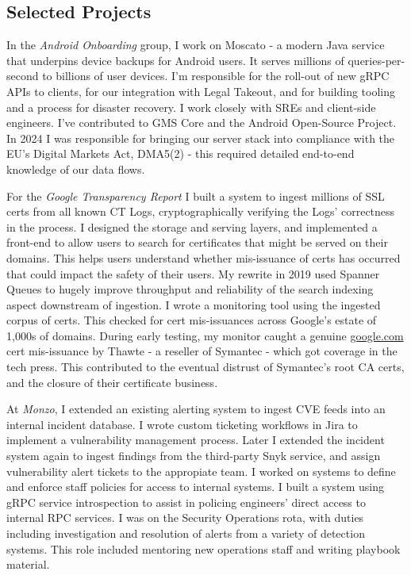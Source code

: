 \documentclass[line]{resume}
\begin{document}
\begin{resume}
    \section{\mysidestyle Selected Projects}

    In the \textsl{Android Onboarding} group, I work on Moscato - a modern Java service that underpins device backups
    for Android users. It serves millions of queries-per-second to billions of user devices. I'm responsible for the
    roll-out of new gRPC APIs to clients, for our integration with Legal Takeout, and for building tooling and a process
    for disaster recovery.  I work closely with SREs and client-side engineers.  I've contributed to GMS Core and the
    Android Open-Source Project.  In 2024 I was responsible for bringing our server stack into compliance with the EU's
    Digital Markets Act, DMA5(2) - this required detailed end-to-end knowledge of our data flows.

    For the \textsl{Google Transparency Report} I built a system to ingest millions of SSL certs from all known CT Logs,
    cryptographically verifying the Logs' correctness in the process.  I designed the storage and serving layers, and
    implemented a front-end to allow users to search for certificates that might be served on their domains.  This
    helps users understand whether mis-issuance of certs has occurred that could impact the safety of their users. My
    rewrite in 2019 used Spanner Queues to hugely improve throughput and reliability of the search indexing aspect
    downstream of ingestion.  I wrote a monitoring tool using the ingested corpus of certs.  This checked for cert
    mis-issuances across Google's estate of 1,000s of domains.  During early testing, my monitor caught a genuine
    \url{google.com} cert mis-issuance by Thawte - a reseller of Symantec - which got coverage in the tech press.  This
    contributed to the eventual distrust of Symantec's root CA certs, and the closure of their certificate business.

    At \textsl{Monzo}, I extended an existing alerting system to ingest CVE feeds into an internal incident database. I
    wrote custom ticketing workflows in Jira to implement a vulnerability management process.  Later I extended the
    incident system again to ingest findings from the third-party Snyk service, and assign vulnerability alert tickets
    to the appropiate team. I worked on systems to define and enforce staff policies for access to internal systems. I
    built a system using gRPC service introspection to assist in policing engineers' direct access to internal RPC
    services.  I was on the Security Operations rota, with duties including investigation and resolution of alerts
    from a variety of detection systems.  This role included mentoring new operations staff and writing playbook
    material.


\end{resume}
\end{document}
